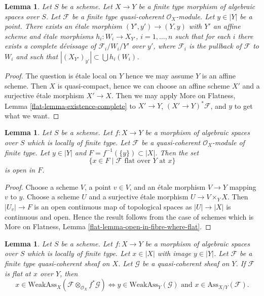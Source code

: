 \documentclass{stacks-project}
\theoremstyle{plain}
\newtheorem{lemma}[subsection]{Lemma}
\theoremstyle{definition}
\theoremstyle{remark}
\numberwithin{equation}{subsection}
\begin{document}
\begin{lemma}
\label{lemma-existence-complete}
Let $S$ be a scheme.
Let $X \to Y$ be a finite type morphism of algebraic spaces over $S$.
Let $\mathcal{F}$ be a finite type quasi-coherent $\mathcal{O}_X$-module.
Let $y \in |Y|$ be a point. There exists an \'etale morphism
$(Y', y') \to (Y, y)$ with $Y'$ an affine scheme and \'etale morphisms
$h_i : W_i \to X_{Y'}$, $i = 1, \ldots, n$ such that for each
$i$ there exists a complete d\'evissage of $\mathcal{F}_i/W_i/Y'$ over $y'$,
where $\mathcal{F}_i$ is the pullback of $\mathcal{F}$ to $W_i$
and such that $|(X_{Y'})_{y'}| \subset \bigcup h_i(W_i)$.
\end{lemma}

\begin{proof}
The question is \'etale local on $Y$ hence we may assume $Y$
is an affine scheme. Then $X$ is quasi-compact, hence we can
choose an affine scheme $X'$ and a surjective \'etale morphism
$X' \to X$. Then we may apply
More on Flatness, Lemma \ref{flat-lemma-existence-complete}
to $X' \to Y$, $(X' \to Y)^*\mathcal{F}$, and $y$ to
get what we want.
\end{proof}

\begin{lemma}
\label{lemma-open-in-fibre-where-flat}
Let $S$ be a scheme.
Let $f : X \to Y$ be a morphism of algebraic spaces over $S$
which is locally of finite type.
Let $\mathcal{F}$ be a quasi-coherent $\mathcal{O}_X$-module of finite type.
Let $y \in |Y|$ and $F = f^{-1}(\{y\}) \subset |X|$. Then the set
$$
\{x \in F \mid \mathcal{F} \text{ flat over }Y\text{ at }x\}
$$
is open in $F$.
\end{lemma}

\begin{proof}
Choose a scheme $V$, a point $v \in V$, and an \'etale morphism $V \to Y$
mapping $v$ to $y$. Choose a scheme $U$ and a surjective \'etale
morphism $U \to V \times_Y X$. Then $|U_v| \to F$ is an open continuous
map of topological spaces as $|U| \to |X|$ is continuous and open.
Hence the result follows from the case of schemes which is
More on Flatness, Lemma \ref{flat-lemma-open-in-fibre-where-flat}.
\end{proof}

\begin{lemma}
\label{lemma-bourbaki-finite-type-general-base-at-point}
Let $S$ be a scheme.
Let $f : X \to Y$ be a morphism of algebraic spaces over $S$ which is
locally of finite type. Let $x \in |X|$ with image $y \in |Y|$.
Let $\mathcal{F}$ be a finite type quasi-coherent sheaf on $X$.
Let $\mathcal{G}$ be a quasi-coherent sheaf on $Y$.
If $\mathcal{F}$ is flat at $x$ over $Y$, then
$$
x \in \text{WeakAss}_X(\mathcal{F} \otimes_{\mathcal{O}_X} f^*\mathcal{G})
\Leftrightarrow
y \in \text{WeakAss}_Y(\mathcal{G})
\text{ and }
x \in \text{Ass}_{X/Y}(\mathcal{F}).
$$
\end{lemma}
\end{document}

